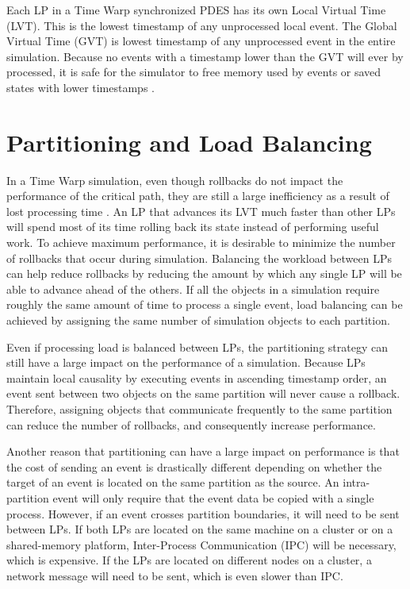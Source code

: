\documentclass[11pt]{book}
\begin{document}
Each LP in a Time Warp synchronized PDES has its own Local Virtual Time (LVT). This is the lowest timestamp of any unprocessed local event. The Global Virtual Time (GVT) is lowest timestamp of any unprocessed event in the entire simulation. Because no events with a timestamp lower than the GVT will ever by processed, it is safe for the simulator to free memory used by events or saved states with lower timestamps \cite{fujimoto-90}.

\section{Partitioning and Load Balancing}

In a Time Warp simulation, even though rollbacks do not impact the performance of the critical path, they are still a large inefficiency as a result of lost processing time \cite{chetlur-06}. An LP that advances its LVT much faster than other LPs will spend most of its time rolling back its state instead of performing useful work. To achieve maximum performance, it is desirable to minimize the number of rollbacks that occur during simulation. Balancing the workload between LPs can help reduce rollbacks by reducing the amount by which any single LP will be able to advance ahead of the others. If all the objects in a simulation require roughly the same amount of time to process a single event, load balancing can be achieved by assigning the same number of simulation objects to each partition.

Even if processing load is balanced between LPs, the partitioning strategy can still have a large impact on the performance of a simulation. Because LPs maintain local causality by executing events in ascending timestamp order, an event sent between two objects on the same partition will never cause a rollback. Therefore, assigning objects that communicate frequently to the same partition can reduce the number of rollbacks, and consequently increase performance.

Another reason that partitioning can have a large impact on performance is that the cost of sending an event is drastically different depending on whether the target of an event is located on the same partition as the source. An intra-partition event will only require that the event data be copied with a single process. However, if an event crosses partition boundaries, it will need to be sent between LPs. If both LPs are located on the same machine on a cluster or on a shared-memory platform, Inter-Process Communication (IPC) will be necessary, which is expensive. If the LPs are located on different nodes on a cluster, a network message will need to be sent, which is even slower than IPC.
\end{document}
